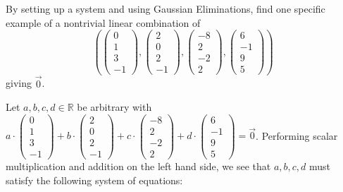 \documentclass[12pt]{article}
\newenvironment{problem}[2][Problem]
{
	\begin{trivlist} 
		\item[\hskip \labelsep {\bfseries #1 #2:}]
	}
{
	\end{trivlist}
	}
\newenvironment{solution}[1][Solution]
{
	\begin{trivlist} 
		\item[\hskip \labelsep {\itshape #1:}]
	}
	{
	\end{trivlist}
}
\begin{document}
\newpage
\begin{problem}{2}
By setting up a system and using Gaussian Eliminations, find one specific example of a nontrivial linear combination of
\[
\left(\begin{pmatrix}0\\1\\3\\-1\end{pmatrix}, \begin{pmatrix}2\\0\\2\\-1\end{pmatrix}, \begin{pmatrix}-8\\2\\-2\\2\end{pmatrix}, \begin{pmatrix}6\\-1\\9\\5\end{pmatrix}\right)
\]
giving $\vec{0}$.
\noindent
\newline
\newline
\begin{solution}
 Let $a,b,c,d \in \mathbb{R}$ be arbitrary with $a\cdot \begin{pmatrix}0\\1\\3\\-1\end{pmatrix} + b\cdot \begin{pmatrix}2\\0\\2\\-1\end{pmatrix} + c\cdot \begin{pmatrix}-8\\2\\-2\\2\end{pmatrix}+ d\cdot \begin{pmatrix}6\\-1\\9\\5\end{pmatrix}=\vec{0}$. Performing scalar multiplication and addition on the left hand side, we see that $a,b,c,d$ must satisfy the following system of equations:
\begin{align*}

\end{align*}
\end{solution}
\end{problem}
\end{document}
